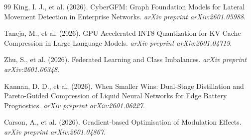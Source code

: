 \documentclass{article}
\begin{document}
\begin{thebibliography}{99}
 King, I. J., et al. (2026). CyberGFM: Graph Foundation Models for Lateral Movement Detection in Enterprise Networks. \emph{arXiv preprint arXiv:2601.05988}.

 Taneja, M., et al. (2026). GPU-Accelerated INT8 Quantization for KV Cache Compression in Large Language Models. \emph{arXiv preprint arXiv:2601.04719}.

 Zhu, S., et al. (2026). Federated Learning and Class Imbalances. \emph{arXiv preprint arXiv:2601.06348}.

 Kannan, D. D., et al. (2026). When Smaller Wins: Dual-Stage Distillation and Pareto-Guided Compression of Liquid Neural Networks for Edge Battery Prognostics. \emph{arXiv preprint arXiv:2601.06227}.

 Carson, A., et al. (2026). Gradient-based Optimisation of Modulation Effects. \emph{arXiv preprint arXiv:2601.04867}.

\end{thebibliography}
\end{document}
